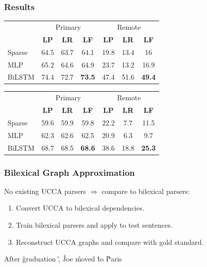 \documentclass[t]{beamer}
\begin{document}
\begin{frame}
\frametitle{Results}
\begin{center}
	\begin{tabular}{l|ccc|ccc}
	& \multicolumn{3}{c|}{Primary} & \multicolumn{3}{c}{Remote} \\
	& \textbf{LP} & \textbf{LR} & \textbf{LF} & \textbf{LP} & \textbf{LR} & \textbf{LF} \\
	\hline
	Sparse
	& 64.5 & 63.7 & 64.1 & 19.8 & 13.4 & 16 \\
	MLP
	& 65.2 & 64.6 & 64.9 & 23.7 & 13.2 & 16.9 \\
	BiLSTM
	& 74.4 & 72.7 & \textbf{73.5} & 47.4 & 51.6 & \textbf{49.4}
	\end{tabular}
	
	\vfill
	\pause
	\begin{tabular}{l|ccc|ccc}
	& \multicolumn{3}{c|}{Primary} & \multicolumn{3}{c}{Remote} \\
	& \textbf{LP} & \textbf{LR} & \textbf{LF} & \textbf{LP} & \textbf{LR} & \textbf{LF} \\
	\hline
	Sparse
	& 59.6 & 59.9 & 59.8 & 22.2 & 7.7 & 11.5 \\
	MLP
	& 62.3 & 62.6 & 62.5 & 20.9 & 6.3 & 9.7 \\
	BiLSTM
	& 68.7 & 68.5 & \textbf{68.6} & 38.6 & 18.8 & \textbf{25.3}
	\end{tabular}
\end{center}
\end{frame}

\begin{frame}
\frametitle{Bilexical Graph Approximation}
No existing UCCA parsers $\Rightarrow$ compare to bilexical parsers:
\begin{enumerate}
 \item Convert UCCA to bilexical dependencies.
 \item Train bilexical parsers and apply to test sentences.
 \item Reconstruct UCCA graphs and compare with gold standard.
\end{enumerate}
\vfill

\begin{center}
	\begin{dependency}
	\begin{deptext}[column sep=.7em,ampersand replacement=\^,font=\rmfamily]
	After \^ graduation \^ , \^ Joe \^ moved \^ to \^ Paris \\
	\end{deptext}
	\end{dependency}
\end{center}
\end{frame}
\end{document}
